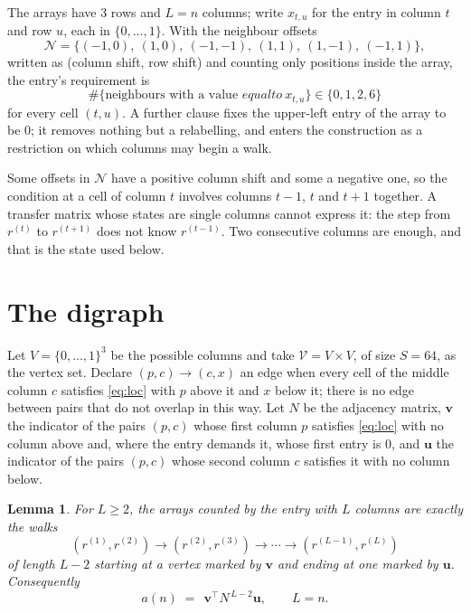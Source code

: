 \documentclass[11pt,a4paper]{article}
\theoremstyle{plain}
\newtheorem{lemma}[theorem]{Lemma}
\theoremstyle{definition}
\begin{document}
The arrays have $3$ rows and $L=n$ columns; write $x_{t,u}$ for the entry in
column $t$ and row $u$, each in $\{0,\dots,1\}$. With the neighbour offsets
\[
\mathcal N=\{(-1,0),\ (1,0),\ (-1,-1),\ (1,1),\ (1,-1),\ (-1,1)\},
\]
written as (column shift, row shift) and counting only positions inside the array, the
entry's requirement is
\begin{equation}\label{eq:loc}
\#\{\text{neighbours with a value }equal to\ x_{t,u}\}\in\{0,1,2,6\}
\end{equation}
for every cell $(t,u)$. A further clause fixes the upper-left entry of the array to be $0$; it removes nothing but a relabelling, and enters the construction as a restriction on which columns may begin a walk.

Some offsets in $\mathcal N$ have a positive column shift and some a negative one, so the
condition at a cell of column $t$ involves columns $t-1$, $t$ and $t+1$ together. A transfer
matrix whose states are single columns cannot express it: the step from $r^{(t)}$ to
$r^{(t+1)}$ does not know $r^{(t-1)}$. Two consecutive columns are enough, and that is
the state used below.

\section{The digraph}

Let $V=\{0,\dots,1\}^{3}$ be the possible columns and take
$\mathcal V=V\times V$, of size $S=64$, as the vertex set. Declare $(p,c)\to(c,x)$ an edge
when every cell of the middle column $c$ satisfies \eqref{eq:loc} with $p$ above it and $x$
below it; there is no edge between pairs that do not overlap in this way. Let $N$ be the
adjacency matrix, $\mathbf{v}$ the indicator of the pairs $(p,c)$ whose first column $p$
satisfies \eqref{eq:loc} with no column above and, where the entry demands it, whose first entry is $0$, and $\mathbf{u}$ the indicator of
the pairs $(p,c)$ whose second column $c$ satisfies it with no column below.

\begin{lemma}\label{lem:walk}
For $L\ge2$, the arrays counted by the entry with $L$ columns are exactly the walks
\[
(r^{(1)},r^{(2)})\to(r^{(2)},r^{(3)})\to\cdots\to(r^{(L-1)},r^{(L)})
\]
of length $L-2$ starting at a vertex marked by $\mathbf{v}$ and ending at one marked by
$\mathbf{u}$. Consequently
\[
a(n)\;=\;\,\mathbf{v}^{\!\top}N^{\,L-2}\mathbf{u},\qquad L=n .
\]
\end{lemma}
\end{document}
